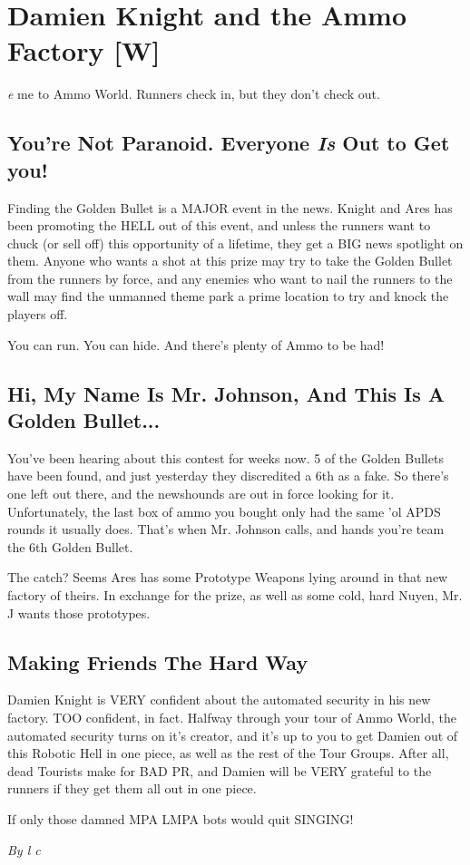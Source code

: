 \documentclass[letterpaper,twocolumn,10.5pt]{article}
\newenvironment{scenario}[6]
	{
		\section{#1 {\small[#2]}}
		\textit{#3}
		\def\TMPSCENARIO{#4 #5}
	}
	{\small\textit{By \TMPSCENARIO}}
\begin{document}
\begin{scenario}{Damien Knight and the Ammo Factory}
Welcome to Ammo World. Runners check in, but they don't check out.

\subsection{You're Not Paranoid. Everyone \textit{Is} Out to Get you!}

Finding the Golden Bullet is a MAJOR event in the news. Knight and Ares has been promoting the HELL out of this event, and unless the runners want to chuck (or sell off) this opportunity of a lifetime, they get a BIG news spotlight on them. Anyone who wants a shot at this prize may try to take the Golden Bullet from the runners by force, and any enemies who want to nail the runners to the wall may find the unmanned theme park a prime location to try and knock the players off.

You can run. You can hide. And there's plenty of Ammo to be had!

\subsection{Hi, My Name Is Mr. Johnson, And This Is A Golden Bullet...}

You've been hearing about this contest for weeks now. 5 of the Golden Bullets have been found, and just yesterday they discredited a 6th as a fake. So there's one left out there, and the newshounds are out in force looking for it. Unfortunately, the last box of ammo you bought only had the same 'ol APDS rounds it usually does. That's when Mr. Johnson calls, and hands you're team the 6th Golden Bullet.

The catch? Seems Ares has some Prototype Weapons lying around in that new factory of theirs. In exchange for the prize, as well as some cold, hard Nuyen, Mr. J wants those prototypes.

\subsection{Making Friends The Hard Way}

Damien Knight is VERY confident about the automated security in his new factory. TOO confident, in fact. Halfway through your tour of Ammo World, the automated security turns on it's creator, and it's up to you to get Damien out of this Robotic Hell in one piece, as well as the rest of the Tour Groups. After all, dead Tourists make for BAD PR, and Damien will be VERY grateful to the runners if they get them all out in one piece.

If only those damned MPA LMPA bots would quit SINGING!

\end{scenario}
\end{document}
